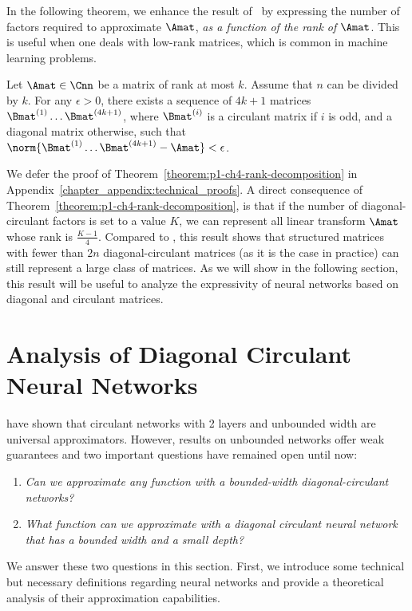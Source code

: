 In the following theorem, we enhance the result of~\citet{huhtanen2015factoring} by expressing the number of factors required to approximate $\Amat$, \emph{as a function of the rank of $\Amat$}.
This is useful when one deals with low-rank matrices, which is common in machine learning problems. 
\begin{theorem}
  Let $\Amat \in \Cnn$ be a matrix of rank at most $k$.
  Assume that $n$ can be divided by $k$.
  For any $\epsilon > 0$, there exists a sequence of $4k+1$ matrices $\Bmat^{(1)} \ldots \Bmat^{(4k+1)}$, where $\Bmat^{(i)}$ is a circulant matrix if $i$ is odd, and a diagonal matrix otherwise, such that $\norm{\Bmat^{(1)} \ldots \Bmat^{(4k+1)} - \Amat} < \epsilon$.
  \label{theorem:p1-ch4-rank-decomposition}
\end{theorem}

\noindent
We defer the proof of Theorem~\ref{theorem:p1-ch4-rank-decomposition} in Appendix~\ref{chapter_appendix:technical_proofs}.
A direct consequence of Theorem~\ref{theorem:p1-ch4-rank-decomposition}, is that if the number of diagonal-circulant factors is set to a value $K$, we can represent all linear transform $\Amat$ whose rank is $\frac{K - 1}{4}$.
Compared to \citet{huhtanen2015factoring}, this result shows that structured matrices with fewer than $2n$ diagonal-circulant matrices (as it is the case in practice) can still represent a large class of matrices.
As we will show in the following section, this result will be useful to analyze the expressivity of neural networks based on diagonal and circulant matrices.


 \section{Analysis of Diagonal Circulant Neural Networks}
\label{section:p1-ch4-analysis_of_diagonal_circulant_neural_networks}

\citet{zhao2017theoretical} have shown that circulant networks with 2 layers and unbounded width are universal approximators.
However, results on unbounded networks offer weak guarantees and two important questions have remained open until now: 
\begin{enumerate}
  \item \emph{Can we approximate any function with a bounded-width diagonal-circulant networks?}
  \item \emph{What function can we approximate with a diagonal circulant neural network that has a bounded width and a small depth?}
\end{enumerate}
We answer these two questions in this section.
First, we introduce some technical but necessary definitions regarding neural networks and provide a theoretical analysis of their approximation capabilities.  

